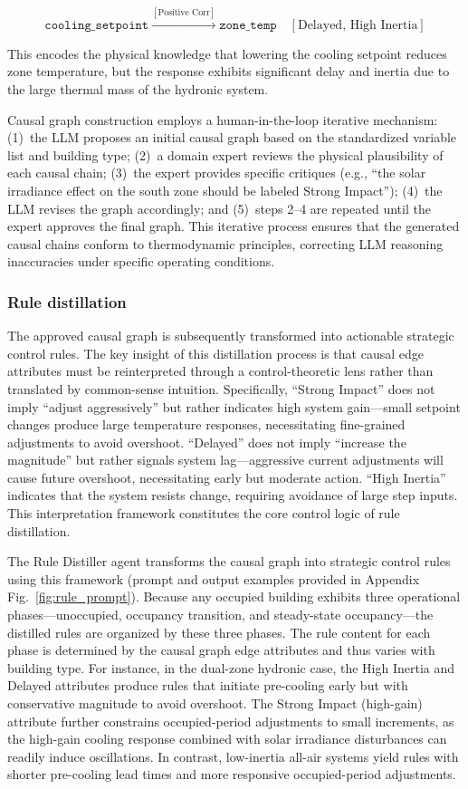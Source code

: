 \documentclass[a4paper]{cas-sc}
\begin{document}
$$\texttt{cooling\_setpoint} \xrightarrow{[\text{Positive Corr}]} \texttt{zone\_temp} \quad [\text{Delayed, High Inertia}]$$

\noindent This encodes the physical knowledge that lowering the cooling setpoint reduces zone temperature, but the response exhibits significant delay and inertia due to the large thermal mass of the hydronic system.

Causal graph construction employs a human-in-the-loop iterative mechanism: (1)~the LLM proposes an initial causal graph based on the standardized variable list and building type; (2)~a domain expert reviews the physical plausibility of each causal chain; (3)~the expert provides specific critiques (e.g., ``the solar irradiance effect on the south zone should be labeled Strong Impact''); (4)~the LLM revises the graph accordingly; and (5)~steps 2--4 are repeated until the expert approves the final graph. This iterative process ensures that the generated causal chains conform to thermodynamic principles, correcting LLM reasoning inaccuracies under specific operating conditions.

\subsubsection{Rule distillation}

The approved causal graph is subsequently transformed into actionable strategic control rules. The key insight of this distillation process is that causal edge attributes must be reinterpreted through a control-theoretic lens rather than translated by common-sense intuition. Specifically, ``Strong Impact'' does not imply ``adjust aggressively'' but rather indicates high system gain---small setpoint changes produce large temperature responses, necessitating fine-grained adjustments to avoid overshoot. ``Delayed'' does not imply ``increase the magnitude'' but rather signals system lag---aggressive current adjustments will cause future overshoot, necessitating early but moderate action. ``High Inertia'' indicates that the system resists change, requiring avoidance of large step inputs. This interpretation framework constitutes the core control logic of rule distillation.

The Rule Distiller agent transforms the causal graph into strategic control rules using this framework (prompt and output examples provided in Appendix Fig.~\ref{fig:rule_prompt}). Because any occupied building exhibits three operational phases---unoccupied, occupancy transition, and steady-state occupancy---the distilled rules are organized by these three phases. The rule content for each phase is determined by the causal graph edge attributes and thus varies with building type. For instance, in the dual-zone hydronic case, the High Inertia and Delayed attributes produce rules that initiate pre-cooling early but with conservative magnitude to avoid overshoot. The Strong Impact (high-gain) attribute further constrains occupied-period adjustments to small increments, as the high-gain cooling response combined with solar irradiance disturbances can readily induce oscillations. In contrast, low-inertia all-air systems yield rules with shorter pre-cooling lead times and more responsive occupied-period adjustments.
\end{document}
